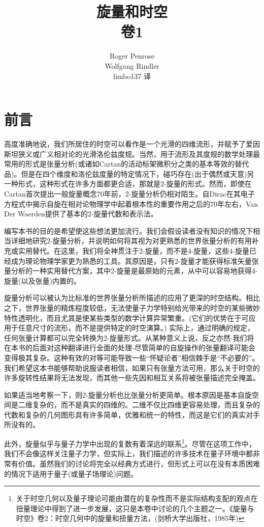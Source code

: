 \documentclass[utf8]{ctexbook}
\title{旋量和时空\\卷1}
\author{Roger Penrose \\Wolfgang Rindler\\limbo137 译}
\numberwithin{equation}{section}
\begin{document}
\maketitle
\tableofcontents
\chapter*{前言}
  高度准确地说，我们所居住的时空可以看作是一个光滑的四维流形，并赋予了爱因斯坦狭义或广义相对论的光滑洛伦兹度规。当然，用于流形及其度规的数学处理最常用的形式是张量分析(或诸如Cartan的活动标架微积分之类的基本等效的替代品)。但是在四个维度和洛伦兹度量的特定情况下，碰巧存在(出于偶然或天意)另一种形式，这种形式在许多方面都更合适，那就是2-旋量的形式。然而，即使在Cartan首次提出一般旋量概念70年前，2-旋量分析仍相对陌生。自Dirac在其电子方程式中揭示自旋在相对论物理学中起着根本性的重要作用之后的70年左右，Van Der Waerden提供了基本的2-旋量代数和表示法。
  
  编写本书的目的是希望使这些想法更加流行。我们会假设读者没有知识的情况下相当详细地研究2-旋量分析，并说明如何将其视为对更熟悉的世界张量分析的有用补充或实用替代。在这里，我们将全神贯注于2-旋量，而不是4-旋量，这些4-旋量已经成为理论物理学家更为熟悉的工具。其原因是，只有2-旋量才能获得标准矢量张量分析的一种实用替代方案，其中2-旋量是最原始的元素，从中可以容易地获得4-旋量(以及张量)内置的。
  
  旋量分析可以被认为比标准的世界张量分析所描述的应用了更深的时空结构。相比之下，世界张量的精炼程度较低，无法使量子力学特别给光带来的时空的某些微妙特性透明化，而且尤其是使某些类型的数学计算异常繁重。(它们的优势在于可应用于任意尺寸的流形，而不是提供特定的时空演算。)
  实际上，通过明确的规定，任何张量计算都可以完全转换为2-旋量形式。从某种意义上说，反之亦然-我们将在本书的后面对这种翻译进行全面的处理-尽管简单的自旋操作的张量翻译可能会变得极其复杂。这种有效的对等可能导致一些“怀疑论者”相信棘手是“不必要的”。我们希望这本书能够帮助说服读者相信，如果只有张量方法可用，那么关于时空的许多旋转性结果将无法发现，而其他一些先因和相互关系将被张量描述完全掩盖。
  
  如果适当地考察一下，则2-旋量分析也比张量分析更简单。根本原因是基本自旋空间是二维复杂的，而不是真实的四维的。二维不仅比四维更容易处理，而且复杂的代数和复杂的几何图形具有许多简单，优雅和统一的特性，而这是它们的真实对手所没有的。
  
  此外，旋量似乎与量子力学中出现的复数有着深远的联系\footnote{关于时空几何以及量子理论可能由潜在的复杂性而不是实际结构支配的观点在扭量理论中得到了进一步发展，这只是本卷中讨论的几个主题之一。《旋量与时空》卷2：时空几何中的旋量和扭量方法，(剑桥大学出版社，1985年)}。尽管在这项工作中，我们不会像这样关注量子力学，但实际上，我们描述的许多技术在量子环境中都非常有价值。虽然我们的讨论将完全以经典方式进行，但形式上可以在没有本质困难的情况下适用于量子(或量子场理论)问题。
  
\end{document}
